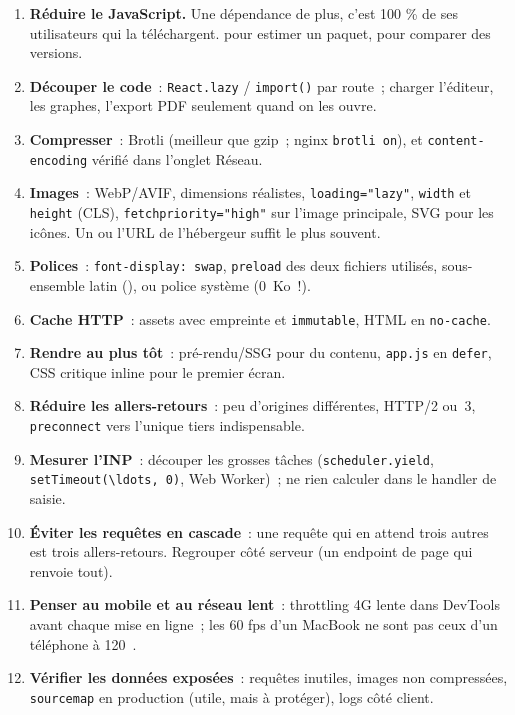 \begin{enumerate}
  \item \textbf{R\'eduire le JavaScript.} Une d\'ependance de plus, c'est 100 \% de ses utilisateurs
        qui la t\'el\'echargent.  pour estimer un paquet,
         pour comparer des versions.
  \item \textbf{D\'ecouper le code}~: \verb|React.lazy| / \verb|import()| par route~; charger
        l'\'editeur, les graphes, l'export PDF seulement quand on les ouvre.
  \item \textbf{Compresser}~: Brotli (meilleur que gzip~; nginx \verb|brotli on|),
        et \verb|content-encoding| v\'erifi\'e dans l'onglet R\'eseau.
  \item \textbf{Images}~: WebP/AVIF, dimensions r\'ealistes, \verb|loading="lazy"|, \verb|width| et
        \verb|height| (CLS), \verb|fetchpriority="high"| sur l'image principale,
        SVG pour les ic\^ones. Un  ou l'URL de
        l'h\'ebergeur suffit le plus souvent.
  \item \textbf{Polices}~: \verb|font-display: swap|, \verb|preload| des deux fichiers utilis\'es,
        sous-ensemble latin (),
        ou police syst\`eme (0~Ko~!).
  \item \textbf{Cache HTTP}~: assets avec empreinte et \verb|immutable|, HTML en \verb|no-cache|.
  \item \textbf{Rendre au plus t\^ot}~: pr\'e-rendu/SSG pour du contenu, \verb|app.js| en \verb|defer|,
        CSS critique inline pour le premier \'ecran.
  \item \textbf{R\'eduire les allers-retours}~: peu d'origines diff\'erentes, HTTP/2 ou~3,
        \verb|preconnect| vers l'unique tiers indispensable.
  \item \textbf{Mesurer l'INP}~: d\'ecouper les grosses t\^aches (\verb|scheduler.yield|,
        \verb|setTimeout(\ldots, 0)|, Web Worker)~; ne rien calculer dans le handler de saisie.
  \item \textbf{\'Eviter les requ\^etes en cascade}~: une requ\^ete qui en attend trois autres est
        trois allers-retours. Regrouper c\^ot\'e serveur (un endpoint de page qui renvoie tout).
  \item \textbf{Penser au mobile et au r\'eseau lent}~: throttling 4G lente dans DevTools avant
        chaque mise en ligne~; les 60 fps d'un MacBook ne sont pas ceux d'un t\'el\'ephone \`a 120~\texteuro{}.
  \item \textbf{V\'erifier les donn\'ees expos\'ees}~: requ\^etes inutiles, images non compress\'ees,
        \verb|sourcemap| en production (utile, mais \`a prot\'eger), logs c\^ot\'e client.
\end{enumerate}

